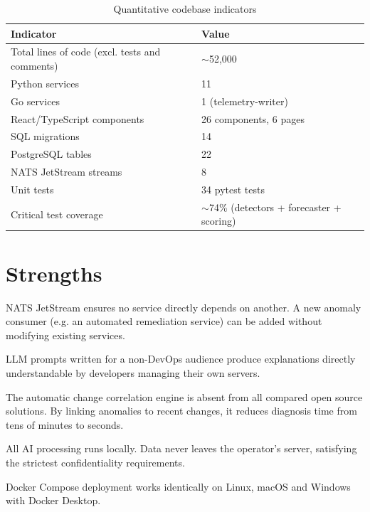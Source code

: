 \begin{table}[H]
\centering
\caption{Quantitative codebase indicators}
\label{tab:codebase-metrics}
\begin{tabularx}{\textwidth}{lX}
\toprule
\textbf{Indicator} & \textbf{Value} \\
\midrule
Total lines of code (excl. tests and comments) & $\sim$52,000 \\
Python services   & 11 \\
Go services       & 1 (telemetry-writer) \\
React/TypeScript components & 26 components, 6 pages \\
SQL migrations    & 14 \\
PostgreSQL tables & 22 \\
NATS JetStream streams & 8 \\
Unit tests        & 34 pytest tests \\
Critical test coverage & $\sim$74\% (detectors + forecaster + scoring) \\
\bottomrule
\end{tabularx}
\end{table}

\section{Strengths}

\begin{description}[leftmargin=2cm]
  \item[Decoupled architecture] NATS JetStream ensures no service directly depends
    on another. A new anomaly consumer (e.g. an automated remediation service)
    can be added without modifying existing services.
  \item[Targeted natural-language explanation] LLM prompts written for a
    non-DevOps audience produce explanations directly understandable by
    developers managing their own servers.
  \item[Change correlation] The automatic change correlation engine is absent
    from all compared open source solutions. By linking anomalies to recent
    changes, it reduces diagnosis time from tens of minutes to seconds.
  \item[Zero cloud dependency] All AI processing runs locally. Data never leaves
    the operator's server, satisfying the strictest confidentiality requirements.
  \item[Portability] Docker Compose deployment works identically on Linux,
    macOS and Windows with Docker Desktop.
\end{description}

